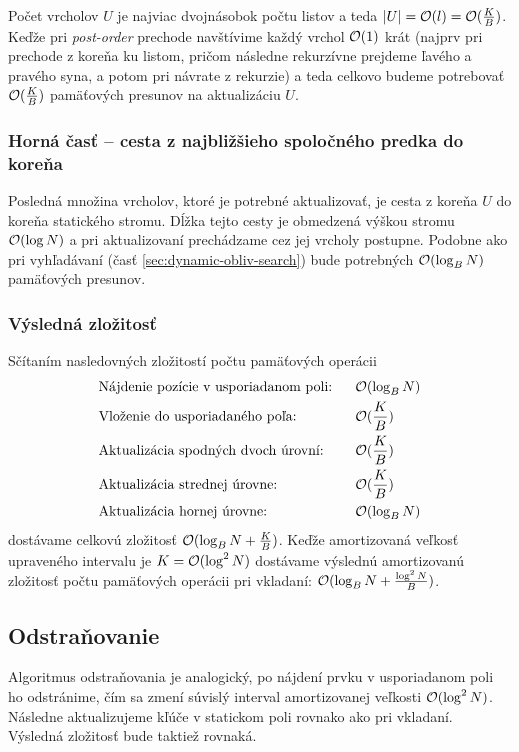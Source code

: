 Počet vrcholov $U$ je najviac dvojnásobok počtu listov a teda $|U| = \mathcal{O}(l) = \mathcal{O}(\frac{K}{B})$. Keďže pri \emph{post-order} prechode navštívime každý vrchol $\mathcal{O}(1)$ krát (najprv pri prechode z koreňa ku listom, pričom následne rekurzívne prejdeme ľavého a pravého syna, a potom pri návrate z rekurzie) a teda celkovo budeme potrebovať $\mathcal{O}(\frac{K}{B})$ pamäťových presunov na aktualizáciu $U$.

\subsubsection{Horná časť -- cesta z najbližšieho spoločného predka do koreňa}
Posledná množina vrcholov, ktoré je potrebné aktualizovať,     je cesta z koreňa $U$ do koreňa statického stromu. Dĺžka tejto cesty je obmedzená výškou stromu $\mathcal{O}(\log{N})$ a pri aktualizovaní prechádzame cez jej vrcholy postupne. Podobne ako pri vyhľadávaní (časť \ref{sec:dynamic-obliv-search}) bude potrebných $\mathcal{O}(\log_B{N})$ pamäťových presunov.

\subsubsection{Výsledná zložitosť}
Sčítaním nasledovných zložitostí počtu pamäťových operácii
\[
\begin{aligned}
&\text{Nájdenie pozície v usporiadanom poli:} ~~ &&\mathcal{O}(\log_B{N}) \\
&\text{Vloženie do usporiadaného poľa:} &&\mathcal{O}(\frac{K}{B}) \\
&\text{Aktualizácia spodných dvoch úrovní:} &&\mathcal{O}(\frac{K}{B}) \\
&\text{Aktualizácia strednej úrovne:} &&\mathcal{O}(\frac{K}{B}) \\
&\text{Aktualizácia hornej úrovne:} &&\mathcal{O}(\log_B{N}) \\
\end{aligned}
\]
dostávame celkovú zložitosť $\mathcal{O}(\log_B{N} + \frac{K}{B})$. Keďže amortizovaná veľkosť upraveného intervalu je $K = \mathcal{O}(\log^2{N})$ dostávame výslednú amortizovanú zložitosť počtu pamäťových operácii pri vkladaní: $\mathcal{O}(\log_B{N} + \frac{\log^2{N}}{B})$.

\subsection{Odstraňovanie}
Algoritmus odstraňovania je analogický, po nájdení prvku v usporiadanom poli ho odstránime, čím sa zmení súvislý interval amortizovanej veľkosti $\mathcal{O}(\log^2{N})$. Následne aktualizujeme kľúče v statickom poli rovnako ako pri vkladaní. Výsledná zložitosť bude taktiež rovnaká.

